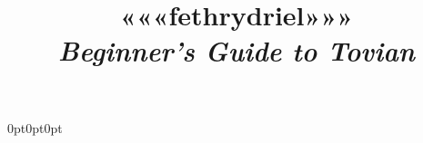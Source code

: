 \documentclass[letterpaper,twocolumn,openany,nodeprecatedcode,hidelinks]{dndbook}
\begin{document}






\title{
    {\fontsize{80pt}{30pt}\tovian «««fethrydriel»»»}\\ %
    \vspace{1in}
    \large \textit{Beginner's Guide to Tovian} \\
    }

\date{}

\newcommand{\continue}[0]{
\newpage
}

\newcommand\blfootnote[1]{%
  \begingroup
  \renewcommand\thefootnote{}\footnotetext{#1}%
  \endgroup
}
\titlespacing*{\subsubsection}
{0pt}{0pt}{0pt}

\newcommand{\ra}[0]{*}
\newcommand{\linkplaceholder}[0]{\subsubsubsection{}}


\newcommand*{\itemrow}[1]{
    \stepcounter{tablectr}%
    \StrSubstitute{#1}{ }{}[\temp] %
    \StrSubstitute{\temp}{'}{}[\templabel] %
    \StrSubstitute{\templabel}{,}{}[\templabel] %
    \label{\templabel}
    \arabic{tablectr}\subsubsubsection{}\stepcounter{tablectr}-\arabic{tablectr} & \textbf{#1}
}
\end{document}
